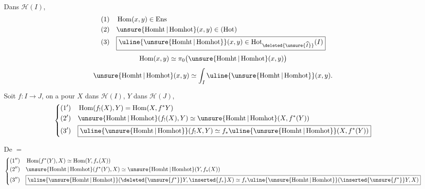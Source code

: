 Dans $\mathcal H(I)$,
\[
\begin{aligned}
(1)\quad&\operatorname{Hom}(x,y)\in\operatorname{Ens}\\
(2)\quad&\unsure{\operatorname{Homht}|\operatorname{Homhot}}(x,y)\in(\operatorname{Hot})\\
(3)\quad&\boxed{\uline{\unsure{\operatorname{Homht}|\operatorname{Homhot}}}(x,y)\in\operatorname{Hot}_{\deleted{\unsure{\widehat I}}}(I)}
\end{aligned}
\]
\[
\operatorname{Hom}(x,y)\simeq\pi_0\bigl(\unsure{\operatorname{Homht}|\operatorname{Homhot}}(x,y)\bigr)
\]
\[
\unsure{\operatorname{Homht}|\operatorname{Homhot}}(x,y)\simeq\int_I\uline{\unsure{\operatorname{Homht}|\operatorname{Homhot}}}(x,y).
\]
\margin{$\begin{gathered}-\\-\end{gathered}$}

Soit $f:I\longrightarrow J$, on a pour $X$ dans $\mathcal H(I)$, $Y$ dans $\mathcal H(J)$,
\[
\left\{\begin{aligned}
(1')\quad&\operatorname{Hom}(f_!(X),Y)=\operatorname{Hom}(X,f^*Y)\\
(2')\quad&\unsure{\operatorname{Homht}|\operatorname{Homhot}}(f_!(X),Y)\simeq\unsure{\operatorname{Homht}|\operatorname{Homhot}}(X,f^*(Y))\\
(3')\quad&\boxed{\uline{\unsure{\operatorname{Homht}|\operatorname{Homhot}}}(f_!X,Y)\simeq f_*\uline{\unsure{\operatorname{Homht}|\operatorname{Homhot}}}(X,f^*(Y))}
\end{aligned}\right.
\]

De $=$
\[
\left\{\begin{aligned}
(1'')\quad&\operatorname{Hom}(f^*(Y),X)\simeq\operatorname{Hom}(Y,f_*(X))\\
(2'')\quad&\unsure{\operatorname{Homht}|\operatorname{Homhot}}(f^*(Y),X)\simeq\unsure{\operatorname{Homht}|\operatorname{Homhot}}(Y,f_*(X))\\
(3'')\quad&\boxed{\uline{\unsure{\operatorname{Homht}|\operatorname{Homhot}}}(\deleted{\unsure{f^*}}Y,\inserted{f_*}X)\simeq f_*\uline{\unsure{\operatorname{Homht}|\operatorname{Homhot}}}(\inserted{\unsure{f^*}}Y,X)}
\end{aligned}\right.
\]

